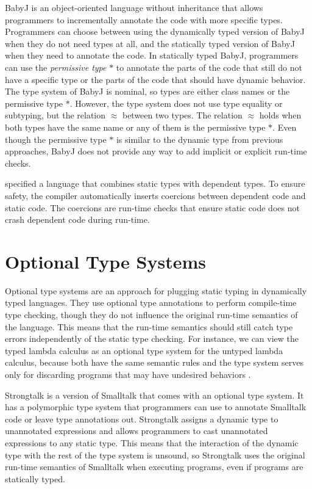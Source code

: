 BabyJ \citep{anderson2003babyj} is an object-oriented language
without inheritance that allows programmers to incrementally annotate
the code with more specific types.
Programmers can choose between using the dynamically typed version
of BabyJ when they do not need types at all, and the statically
typed version of BabyJ when they need to annotate the code.
In statically typed BabyJ, programmers can use the
\emph{permissive type} $*$ to annotate the parts of the code that
still do not have a specific type or the parts of the code that should
have dynamic behavior.
The type system of BabyJ is nominal, so types are either class names
or the permissive type $*$.
However, the type system does not use type equality or subtyping,
but the relation $\approx$ between two types.
The relation $\approx$ holds when both types have the same name or
any of them is the permissive type $*$.
Even though the permissive type $*$ is similar to the dynamic type
from previous approaches, BabyJ does not provide any way to add
implicit or explicit run-time checks.

\citet{ou2004dtd} specified a language that combines static types
with dependent types.
To ensure safety, the compiler automatically inserts coercions
between dependent code and static code.
The coercions are run-time checks that ensure static code does not
crash dependent code during run-time.

\section{Optional Type Systems}
\label{sec:optional}

Optional type systems \citep{bracha2004pluggable} are an approach for
plugging static typing in dynamically typed languages.
They use optional type annotations to perform compile-time type checking,
though they do not influence the original run-time semantics
of the language.
This means that the run-time semantics should still catch type errors
independently of the static type checking.
For instance, we can view the typed lambda calculus as an optional
type system for the untyped lambda calculus, because both have the
same semantic rules and the type system serves only for discarding
programs that may have undesired behaviors \citep{bracha2004pluggable}.

Strongtalk \citep{bracha1993strongtalk,bracha1996strongtalk} is
a version of Smalltalk that comes with an optional type system.
It has a polymorphic type system that programmers can use to annotate
Smalltalk code or leave type annotations out.
Strongtalk assigns a dynamic type to unannotated expressions and allows
programmers to cast unannotated expressions to any static type.
This means that the interaction of the dynamic type with the rest of
the type system is unsound, so Strongtalk uses the original run-time
semantics of Smalltalk when executing programs, even if programs are
statically typed.

